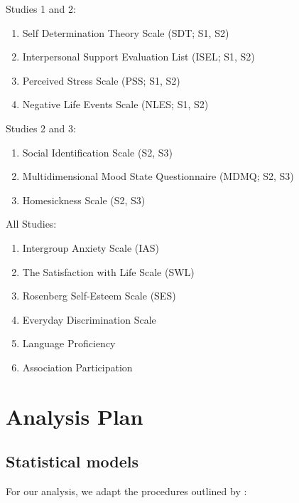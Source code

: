 \documentclass[]{article}
\providecommand{\tightlist}{%
\setlength{\itemsep}{0pt}\setlength{\parskip}{0pt}}
\begin{document}
Studies 1 and 2:

\begin{enumerate}
\def\labelenumi{\arabic{enumi}.}
\tightlist
\item
  Self Determination Theory Scale (SDT; S1, S2)
\item
  Interpersonal Support Evaluation List (ISEL; S1, S2)
\item
  Perceived Stress Scale (PSS; S1, S2)
\item
  Negative Life Events Scale (NLES; S1, S2)
\end{enumerate}

Studies 2 and 3:

\begin{enumerate}
\def\labelenumi{\arabic{enumi}.}
\tightlist
\item
  Social Identification Scale (S2, S3)
\item
  Multidimensional Mood State Questionnaire (MDMQ; S2, S3)
\item
  Homesickness Scale (S2, S3)
\end{enumerate}

All Studies:

\begin{enumerate}
\def\labelenumi{\arabic{enumi}.}
\tightlist
\item
  Intergroup Anxiety Scale (IAS)
\item
  The Satisfaction with Life Scale (SWL)
\item
  Rosenberg Self-Esteem Scale (SES)
\item
  Everyday Discrimination Scale
\item
  Language Proficiency
\item
  Association Participation
\end{enumerate}

\color{black}

\hypertarget{analysis-plan}{%
\section{Analysis Plan}\label{analysis-plan}}

\hypertarget{statistical-models}{%
\subsection{Statistical models}\label{statistical-models}}

For our analysis, we adapt the procedures outlined by
\citet{Monden2015}:
\end{document}
